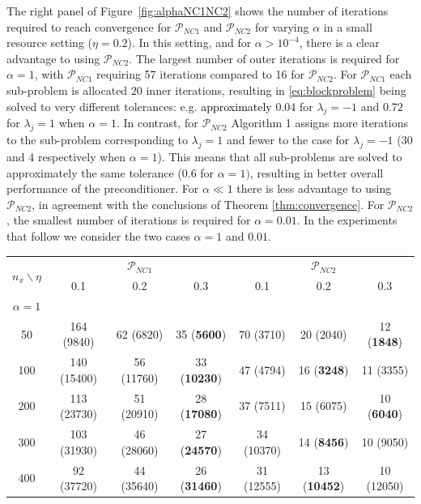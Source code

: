 \documentclass{article}
\newcommand{\aw}{\textcolor{black}}%
\newcommand{\resource}{\eta}
\theoremstyle{definition}
\begin{document}
{		
		
		
		The right panel of Figure~\ref{fig:alphaNC1NC2} shows the number of iterations required to reach convergence for $\mathcal{P}_{NC1}$ and $\mathcal{P}_{NC2}$ for varying $\alpha$ in a small resource setting ($\resource=0.2$). In this setting, and for $\alpha>10^{-4}$, there is a clear advantage to using $\mathcal{P}_{NC2}$. The largest number of {outer} iterations is required for $\alpha = 1$, with $\mathcal{P}_{NC1}$ requiring 57 iterations compared to 16 for $\mathcal{P}_{NC2}$. 
		For $\mathcal{P}_{NC1}$ each sub-problem is allocated $20$ inner iterations, resulting in \eqref{eq:blockproblem} being solved to very different tolerances: e.g. \aw{approximately} $0.04$ for $\lambda_j=-1$ and $0.72$ for $\lambda_j=1$ when $\alpha=1$. 
		In contrast, for $\mathcal{P}_{NC2}$ Algorithm 1 assigns more iterations to the sub-problem corresponding to $\lambda_j=1$ and fewer to the case for $\lambda_j=-1$ ($30$ and $4$ respectively when $\alpha=1$). This means that all sub-problems are solved to approximately the same tolerance ($0.6$ for $\alpha=1)$, resulting in better overall performance of the preconditioner.  For $\alpha \ll 1$ there is less advantage to using $\mathcal{P}_{NC2}$, in agreement with the conclusions of Theorem \ref{thm:convergence}. For $\mathcal{P}_{NC2}$, the smallest number of iterations is required for $\alpha = 0.01$.  In the experiments that follow we consider the two cases $\alpha = 1$ and $0.01$.
		
		
		
		
		
		
		
		\begin{table}[]
			\centering
			\begin{tabular}{c|ccc|ccc}
				
				\multirow{2}{*}{\Large $n_x \backslash {\resource}$ } & \multicolumn{3}{c|}{$\mathcal{P}_{NC1}$} & \multicolumn{3}{c}{$\mathcal{P}_{NC2}$}\\   
				& 0.1&0.2&0.3 & 0.1&0.2&0.3 \\
				\hline
				$\alpha = 1$&&&&&&\\ \hline
				50  & 164	(9840) & 62	(6820) &	35	(\textbf{5600}) &	70	(3710) &	20	(2040)	&12	(\textbf{1848})\\
				100 & 140	(15400) &	56	(11760) &	33	(\textbf{10230})&	47	(4794)	& 16	(\textbf{3248})&	11	(3355)\\
				200& 113	(23730)	&51	(20910) &	28	(\textbf{17080})&	37	(7511)&	15	({6075})	&10	(\textbf{6040})\\
				300& 103	(31930)&	46	(28060)&	27	(\textbf{24570})&	34	(10370)&	14	(\textbf{8456})&	10	(9050)\\
				400 & 92	(37720)&	44	(35640)&	26	(\textbf{31460}) &	31	(12555) &	13	(\textbf{10452})&	10	(12050)\\
				

\end{tabular}
\end{table}}
\end{document}
